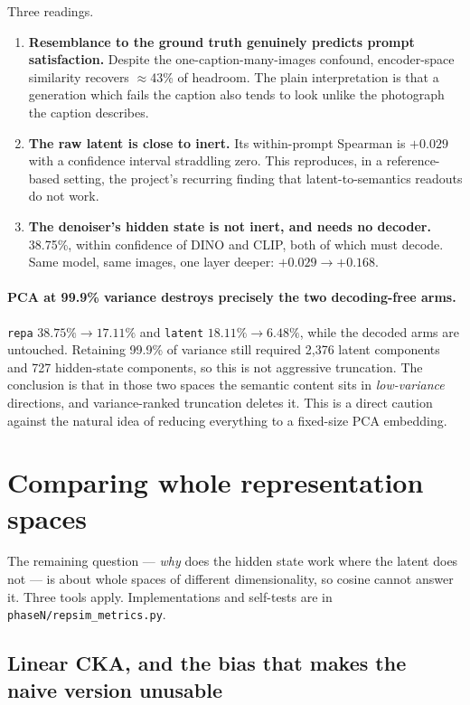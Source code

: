 \documentclass[10pt]{article}
\newcommand{\obs}[1]{\textcolor{observedblue}{#1}}
\begin{document}
Three readings.

\begin{enumerate}
  \item \textbf{Resemblance to the ground truth genuinely predicts prompt satisfaction.} Despite the
    one-caption-many-images confound, encoder-space similarity recovers \obs{$\approx$43\%} of
    headroom. The plain interpretation is that a generation which fails the caption also tends to
    look unlike the photograph the caption describes.
  \item \textbf{The raw latent is close to inert.} Its within-prompt Spearman is \obs{$+0.029$} with
    a confidence interval straddling zero. This reproduces, in a reference-based setting, the
    project's recurring finding that latent-to-semantics readouts do not work.
  \item \textbf{The denoiser's hidden state is not inert, and needs no decoder.} \obs{38.75\%},
    within confidence of DINO and CLIP, both of which must decode. Same model, same images, one
    layer deeper: \obs{$+0.029 \to +0.168$}.
\end{enumerate}

\paragraph{PCA at 99.9\% variance destroys precisely the two decoding-free arms.}
\texttt{repa} \obs{$38.75\% \to 17.11\%$} and \texttt{latent} \obs{$18.11\% \to 6.48\%$}, while the
decoded arms are untouched. Retaining 99.9\% of variance still required \obs{2{,}376} latent
components and \obs{727} hidden-state components, so this is not aggressive truncation. The
conclusion is that in those two spaces the semantic content sits in \emph{low-variance} directions,
and variance-ranked truncation deletes it. This is a direct caution against the natural idea of
reducing everything to a fixed-size PCA embedding.

\section{Comparing whole representation spaces}
\label{sec:repmetrics}

The remaining question --- \emph{why} does the hidden state work where the latent does not --- is
about whole spaces of different dimensionality, so cosine cannot answer it. Three tools apply.
Implementations and self-tests are in \texttt{phaseN/repsim\_metrics.py}.

\subsection{Linear CKA, and the bias that makes the naive version unusable}
\end{document}
